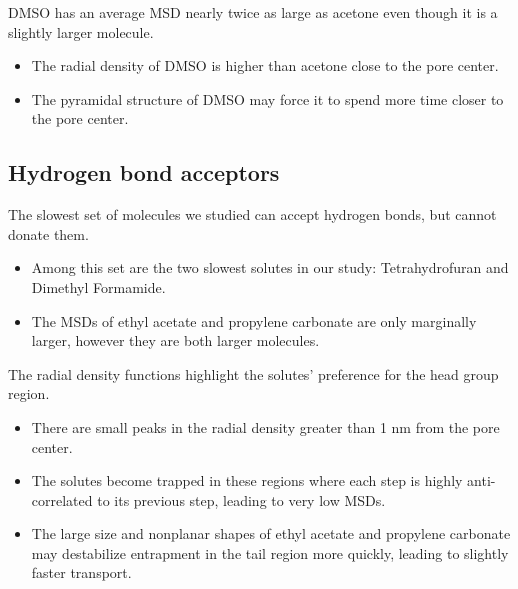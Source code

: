 \documentclass{article}
\begin{document}
  \noindent DMSO has an average MSD nearly twice as large as acetone even though it
  is a slightly larger molecule.
  \begin{itemize}
    \item The radial density of DMSO is higher than acetone close to the pore center.
  	\item The pyramidal structure of DMSO may force it to spend more time closer to
  	the pore center.
  \end{itemize}  
  
  \subsection*{Hydrogen bond acceptors}  %

  The slowest set of molecules we studied can accept hydrogen bonds, but cannot donate
  them. 
  \begin{itemize}
  	\item Among this set are the two slowest solutes in our study: Tetrahydrofuran and Dimethyl Formamide.
  	\item The MSDs of ethyl acetate and propylene carbonate are only marginally larger,
  	however they are both larger molecules. %
  \end{itemize}  
  
  The radial density functions highlight the solutes' preference for the 
  head group region.
  \begin{itemize}
  	\item There are small peaks in the radial density greater than 1 nm 
  	from the pore center.
  	\item The solutes become trapped in these regions where each step is
  	highly anti-correlated to its previous step, leading to very low MSDs.
  	\item The large size and nonplanar shapes of ethyl acetate and propylene 
  	carbonate may destabilize entrapment in the tail region more quickly, leading
  	to slightly faster transport. 
  \end{itemize}
  
\end{document}
